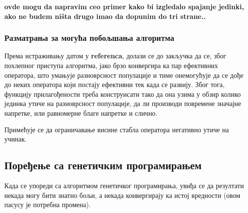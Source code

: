 \documentclass[a4paper]{article}
\begin{document}
\textbf{ovde mogu da napravim ceo primer kako bi izgledalo spajanje jedinki, ako ne budem ništa drugo imao da dopunim do tri strane..}

\subsubsection{Разматрања за могућа побољшања алгоритма}
\label{mgp_poboljsanja}
Према истраживању датом у \textbf{referenca}, долази се до закључка да се, због похлепног приступа алгоритма, јако брзо конвергира ка пар ефективних оператора, што умањује разноврсност популације и тиме онемогућује да се дође до неких оператора који постају ефективни тек када се развију. Због тога, функцију прилагођености треба конструисати тако да она узима у обзир колико јединка утиче на разноврсност популације, да ли производи повремене значајне напретке, или равномерне благе напретке и слично.
\newline

Примећује се да ограничавање висине стабла оператора негативно утиче на учинак.

\subsection{Поређење са генетичким програмирањем}

Када се упореди са алгоритмом генетичког програмирања, увиђа се да резултати некада могу бити знатно бољи, а некада конвергирају ка истој вредности (овом пасусу је потребна промена).
\end{document}
